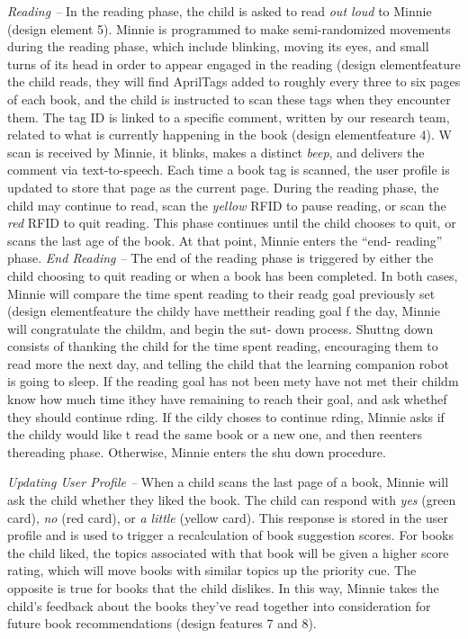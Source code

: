 \documentclass{sigchi}
\begin{document}
\textit{Reading --} In the reading phase, the child is asked to read \textit{out loud} to Minnie (design element 5). Minnie is programmed to make semi-randomized movements during the reading phase, which include blinking, moving its eyes, and small turns of its head in order to appear engaged in the reading (design elementfeature the child reads, they will find AprilTags added to roughly every three to six pages of each book, and the child is instructed to scan these tags when they encounter them. The tag ID is linked to a specific comment, written by our research team, related to what is currently happening in the book (design elementfeature 4). W scan is received by Minnie, it blinks, makes a distinct \textit{beep}, and delivers the comment via text-to-speech. Each time a book tag is scanned, the user profile is updated to store that page as the current page. During the reading phase, the child may continue to read, scan the \textit{yellow} RFID to pause reading, or scan the \textit{red} RFID to quit reading. This phase continues until the child chooses to quit, or scans the last age of the book. At that point, Minnie enters the ``end- reading'' phase.
\textit{End Reading --} The end of the reading phase is triggered by either the child choosing to quit reading or when a book has been completed. In both cases, Minnie will compare the time spent reading to their readg goal previously set (design elementfeature the childy have mettheir reading goal f the day, Minnie will congratulate the childm, and begin the sut- down process. Shuttng down consists of thanking the child for the time spent reading, encouraging them to read more the next day, and telling the child that the learning companion robot is going to sleep. If the reading goal has not been mety have not met their  childm know how much time ithey have remaining to reach their goal, and ask whethef they should continue rding. If the cildy choses to continue rding, Minnie asks if the childy would like t read the same book or a new one, and then reenters thereading phase. Otherwise, Minnie enters the shu down procedure. 

\textit{Updating User Profile --} When a child scans the last page of a book, Minnie will ask the child whether they liked the book. The child can respond with \textit{yes} (green card), \textit{no} (red card), or \textit{a little} (yellow card). This response is stored in the user profile and is used to trigger a recalculation of book suggestion scores. For books the child liked, the topics associated with that book will be given a higher score rating, which will move books with similar topics up the priority cue. The opposite is true for books that the child dislikes. In this way, Minnie takes the child's feedback about the books they've read together into consideration for future book recommendations (design features 7 and 8).
\end{document}
